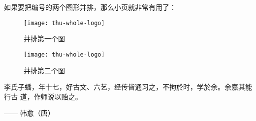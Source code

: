 如果要把编号的两个图形并排，那么小页就非常有用了：
\begin{figure}
\begin{minipage}{0.48\textwidth}
  \centering
  \texttt{[image: thu-whole-logo]}
  \caption{并排第一个图}
  \label{fig:parallel1}
\end{minipage}\hfill
\begin{minipage}{0.48\textwidth}
  \centering
  \texttt{[image: thu-whole-logo]}
  \caption{并排第二个图}
  \label{fig:parallel2}
\end{minipage}
\end{figure}

李氏子蟠，年十七，好古文、六艺，经传皆通习之，不拘於时，学於余。余嘉其能行古
道，作师说以贻之。

\hfill —— 韩愈（唐）
